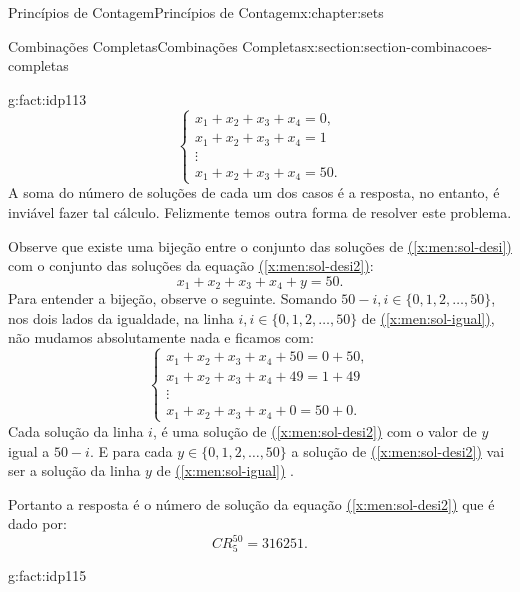 \documentclass[oneside,10pt,]{book}
\newcommand{\xreffont}{\relax}
\numberwithin{equation}{section}
\begin{document}
\begin{chapterptx}{Princípios de Contagem}{}{Princípios de Contagem}{}{}{x:chapter:sets}
\begin{sectionptx}{Combinações Completas}{}{Combinações Completas}{}{}{x:section:section-combinacoes-completas}
\begin{fact}{}{}{g:fact:idp113}
\begin{equation}
\begin{cases} x_1 + x_2 + x_3 + x_4  = 0,\\
x_1 + x_2 + x_3 + x_4  = 1\\
\vdots \\
x_1 + x_2 + x_3 + x_4  = 50.\end{cases}\label{x:men:sol-igual}
\end{equation}
A soma do número de soluções de cada um dos casos é a resposta, no entanto, é inviável fazer tal cálculo. Felizmente temos outra forma de resolver este problema.%
\par
Observe que existe uma bijeção entre o conjunto das soluções de \hyperref[x:men:sol-desi]{({\xreffont\ref{x:men:sol-desi}})} com o conjunto das soluções da equação \hyperref[x:men:sol-desi2]{({\xreffont\ref{x:men:sol-desi2}})}:%
%
\begin{equation}
x_1 + x_2 + x_3 + x_4 + y  = 50.\label{x:men:sol-desi2}
\end{equation}
Para entender a bijeção, observe o seguinte. Somando \(50-i, i\in \{0, 1, 2, \ldots, 50\}\), nos dois lados da igualdade, na linha \(i, i\in \{0, 1, 2, \ldots, 50\}\) de \hyperref[x:men:sol-igual]{({\xreffont\ref{x:men:sol-igual}})}, não mudamos absolutamente nada e ficamos com:%
%
\begin{equation}
\begin{cases} x_1 + x_2 + x_3 + x_4 + 50 = 0 + 50,\\
x_1 + x_2 + x_3 + x_4 + 49  = 1 +49 \\
\vdots \\
x_1 + x_2 + x_3 + x_4 + 0  = 50+0.\end{cases}\label{g:men:idp114}
\end{equation}
Cada solução da linha \(i\), é uma solução de \hyperref[x:men:sol-desi2]{({\xreffont\ref{x:men:sol-desi2}})} com o valor de \(y\) igual a \(50-i\). E para cada \(y\in \{0, 1, 2, \ldots, 50\}\) a solução de \hyperref[x:men:sol-desi2]{({\xreffont\ref{x:men:sol-desi2}})} vai ser a solução da linha \(y\) de \hyperref[x:men:sol-igual]{({\xreffont\ref{x:men:sol-igual}})} .%
\par
Portanto a resposta é o número de solução da equação \hyperref[x:men:sol-desi2]{({\xreffont\ref{x:men:sol-desi2}})} que é dado por:%
%
\begin{equation*}
CR_5^{50} = 316251. 
\end{equation*}
\end{fact}
\begin{fact}{}{}{g:fact:idp115}%

\end{fact}
\end{sectionptx}
\end{chapterptx}
\end{document}
